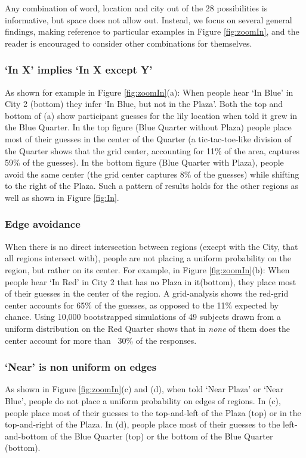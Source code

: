 \documentclass[10pt,letterpaper]{article}
\begin{document}
Any combination of word, location and city out of the 28 possibilities is informative, but space does not allow out. Instead, we focus on several general findings, making reference to particular examples in Figure \ref{fig:zoomIn}, and the reader is encouraged to consider other combinations for themselves.

\subsubsection{`In X' implies `In X except Y'} As shown for example in Figure \ref{fig:zoomIn}(a): When people hear `In Blue' in City 2 (bottom) they infer `In Blue, but not in the Plaza'. Both the top and bottom of (a) show participant guesses for the lily location when told it grew in the Blue Quarter. In the top figure (Blue Quarter without Plaza) people place most of their guesses in the center of the Quarter (a tic-tac-toe-like division of the Quarter shows that the grid center, accounting for 11\% of the area, captures 59\% of the guesses). In the bottom figure (Blue Quarter with Plaza), people avoid the same center (the grid center captures 8\% of the guesses) while shifting to the right of the Plaza. Such a pattern of results holds for the other regions as well as shown in Figure \ref{fig:In}. 

\subsubsection{Edge avoidance} When there is no direct intersection between regions (except with the City, that all regions intersect with), people are not placing a uniform probability on the region, but rather on its center. For example, in Figure \ref{fig:zoomIn}(b): When people hear `In Red' in City 2 that has no Plaza in it(bottom), they place most of their guesses in the center of the region. A grid-analysis shows the red-grid center accounts for 65\% of the guesses, as opposed to the 11\% expected by chance. Using 10,000 bootstrapped simulations of 49 subjects drawn from a uniform distribution on the Red Quarter shows that in \textit{none} of them does the center account for more than ~30\% of the responses. 

\subsubsection{`Near' is non uniform on edges} As shown in Figure \ref{fig:zoomIn}(c) and (d), when told `Near Plaza' or `Near Blue', people do not place a uniform probability on edges of regions. In (c), people place most of their guesses to the top-and-left of the Plaza (top) or in the top-and-right of the Plaza. In (d), people place most of their guesses to the left-and-bottom of the Blue Quarter (top) or the bottom of the Blue Quarter (bottom). 
\end{document}
